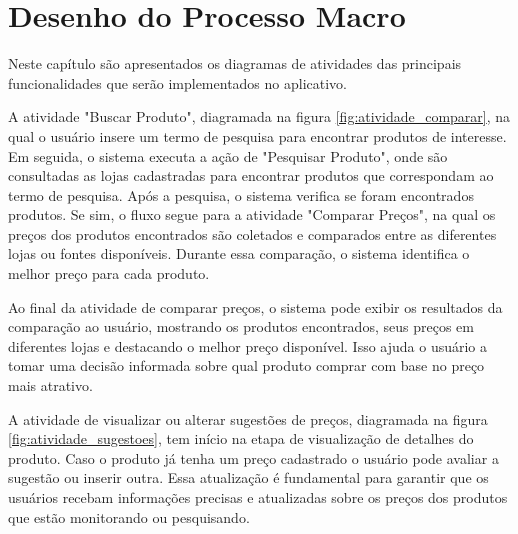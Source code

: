 \chapter{Desenho do Processo Macro} \label{cha:desenhomacro}
Neste capítulo são apresentados os diagramas de atividades das principais funcionalidades que serão implementados no aplicativo.


A atividade "Buscar Produto", diagramada na figura \autoref{fig:atividade_comparar}, na qual o usuário insere um termo de pesquisa para encontrar produtos de interesse. Em seguida, o sistema executa a ação de "Pesquisar Produto", onde são consultadas as lojas cadastradas para encontrar produtos que correspondam ao termo de pesquisa. Após a pesquisa, o sistema verifica se foram encontrados produtos. Se sim, o fluxo segue para a atividade "Comparar Preços", na qual os preços dos produtos encontrados são coletados e comparados entre as diferentes lojas ou fontes disponíveis. Durante essa comparação, o sistema identifica o melhor preço para cada produto.

Ao final da atividade de comparar preços, o sistema pode exibir os resultados da comparação ao usuário, mostrando os produtos encontrados, seus preços em diferentes lojas e destacando o melhor preço disponível. Isso ajuda o usuário a tomar uma decisão informada sobre qual produto comprar com base no preço mais atrativo.

A atividade de visualizar ou alterar sugestões de preços, diagramada na figura \autoref{fig:atividade_sugestoes}, tem início na etapa de visualização de detalhes do produto. Caso o produto já tenha um preço cadastrado o usuário pode avaliar a sugestão ou inserir outra. Essa atualização é fundamental para garantir que os usuários recebam informações precisas e atualizadas sobre os preços dos produtos que estão monitorando ou pesquisando.

